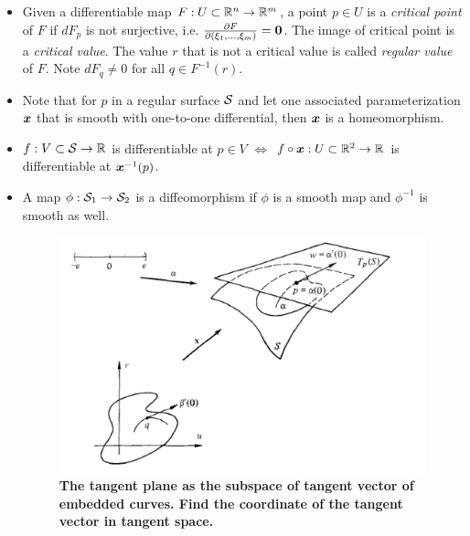 \documentclass[11pt]{article}
\begin{document}
\begin{itemize}
\item \begin{definition}
 Given a differentiable map $F: U\subset {\mathbb R}^{n} \rightarrow {\mathbb R}^{m}$, a point $p\in U$ is a \emph{critical point} of $F$ if $dF_{p}$ is not surjective, i.e. $\frac{\partial F}{ \partial (\xi_{1}, \ldots, \xi_{m})} = \boldsymbol{0}$. The image of critical point is a \emph{critical value}. The value $r$ that is not a critical value is called \emph{regular value} of $F$. Note $dF_{q} \neq 0$ for all $q\in F^{-1}(r)$.
 \end{definition} 

\item Note that for $p$ in a regular surface ${\mathcal S}$ and let one associated parameterization $\boldsymbol{x}$ that is smooth with one-to-one differential, then $\boldsymbol{x}$ is a homeomorphism. 

\item $f: V\subset {\mathcal S} \rightarrow {\mathbb R}$ is differentiable at $p\in V$ $\Leftrightarrow$ $f\circ \boldsymbol{x}: U\subset {\mathbb R}^{2} \rightarrow {\mathbb R}$ is differentiable at $\boldsymbol{x}^{-1}(p)$.

\item  \begin{definition}
A map $\phi: {\mathcal S}_{1} \rightarrow {\mathcal S}_{2}$ is a diffeomorphism if $\phi$ is a smooth map and $\phi^{-1}$ is smooth as well. \\[10pt]
\end{definition} 

\begin{figure}[htb]
\centering
\begin{minipage}{0.6\linewidth}
 \centerline{\includegraphics[scale = 0.5]{tangent_plane.png}}
\end{minipage}
\caption{\scriptsize
\textbf{The tangent plane as the subspace of tangent vector of embedded curves. Find the coordinate of the tangent vector in tangent space.}}
\end{figure}


\end{itemize}
\end{document}
